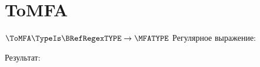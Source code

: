 \section{ToMFA}
\begin{frame}{$\ToMFA\TypeIs\BRefRegexTYPE\to\MFATYPE$}
	Регулярное выражение:

	Результат:

\end{frame}